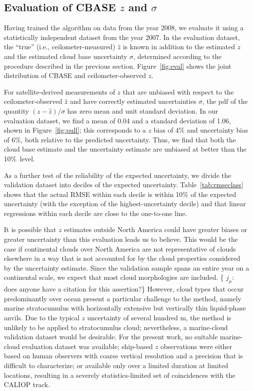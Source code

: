 \documentclass[essd,manuscript]{copernicus}\usepackage[]{graphicx}\usepackage[]{color}
\newcommand{\hlnum}[1]{\textcolor[rgb]{0.686,0.059,0.569}{#1}}%
\newcommand\comment[2]{\{\hlnum{ \textit{#1}: #2}\}}
\newcommand\commentjm[1]{\comment{$j_\mu$}{#1}}
\newcommand\CBH{\ensuremath{z}}
\begin{document}
\subsection{Evaluation of CBASE \CBH{} and $\sigma$}
\label{sec:algorithm:eval}

Having trained the algorithm on data from the year 2008, we evaluate it using a
statistically independent dataset from the year 2007.  In the evaluation
dataset, the ``true'' (i.e., ceilometer-measured) $\hat{z}$ is known in
addition to the estimated \CBH{} and the estimated cloud base uncertainty $\sigma$,
determined according to the procedure described in the previous section.
Figure~\ref{fig:eval} shows the joint distribution of CBASE and
ceilometer-observed \CBH{}.  

For satellite-derived measurements of \CBH{} that are unbiased with respect
to the ceilometer-observed $\hat{\CBH}$ and have correctly estimated
uncertainties $\sigma$, the pdf of the quantity $(\CBH - \hat{z})/\sigma$ has zero
mean and unit standard deviation. In our evaluation dataset, we find a mean of
0.04 and a standard
deviation of 1.06, shown in
Figure~\ref{fig:pull}; this corresponds to a \CBH{} bias of %
4\% and
uncertainty bias of %
6\%,
both relative to the predicted uncertainty.  Thus, we find that both the cloud
base estimate and the uncertainty estimate are unbiased at better than the 10\%\
level.

As a further test of the reliability of the expected uncertainty, we divide the
validation dataset into deciles of the expected uncertainty.
Table~\ref{tab:rmseclass} shows that the actual RMSE within each decile is
within 10\% of the expected uncertainty (with the exception of the highest-uncertainty
decile) and that linear regressions within each
decile are close to the one-to-one line.

It is possible that \CBH{} estimates outside North America could have greater
biases or greater uncertainty than this evaluation leads us to believe.  This
would be the case if continental clouds over North America are not
representative of clouds elsewhere in a way that is not accounted for by the
cloud properties considered by the uncertainty estimate.  Since the validation
sample spans an entire year on a continental scale, we expect that most cloud
morphologies are included.
\commentjm{does anyone have a citation for this assertion?} 
However, cloud types that occur predominantly over ocean
present a particular challenge to the method, namely marine stratocumulus with
horizontally extensive but vertically thin liquid-phase anvils.  Due to the
typical \CBH{} uncertainty of several hundred m, the method is unlikely to be
applied to stratocumulus cloud; nevertheless, a marine-cloud validation dataset
would be desirable.  For the present work, no suitable marine-cloud evaluation
dataset was available; ship-based \CBH{} observations were either based on human
observers with coarse vertical resolution and a precision that is difficult to
characterize; or available only over a limited duration at limited
locations, resulting in a severely statistics-limited set of coincidences with
the CALIOP track.
\end{document}

